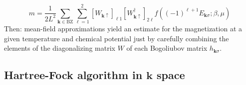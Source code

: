 \begin{equation}\label{appeq:antiferromagnet-magnetization-self-consistence-finite-temperature}
	m = \frac{1}{2L^2} \sum_{\mathbf{k} \in \mathrm{BZ}} \sum_{\ell=1}^2 
	[
		W_{\mathbf{k}\uparrow}
	]_{\ell 1} [
		W_{\mathbf{k}\uparrow}^\dagger
	]_{2 \ell}
	f\left(
		(-1)^{\ell+1} E_{\mathbf{k}\sigma}; \beta,\mu
	\right)
\end{equation}
Then: mean-field approximations yield an estimate for the magnetization at a given temperature and chemical potential just by carefully combining the elements of the diagonalizing matrix $W$ of each Bogoliubov matrix $h_{\mathbf{k}\sigma}$.

\subsection{Hartree-Fock algorithm in $\mathbf{k}$ space}\label{appsubsec:hartree-fock-algorithm}

